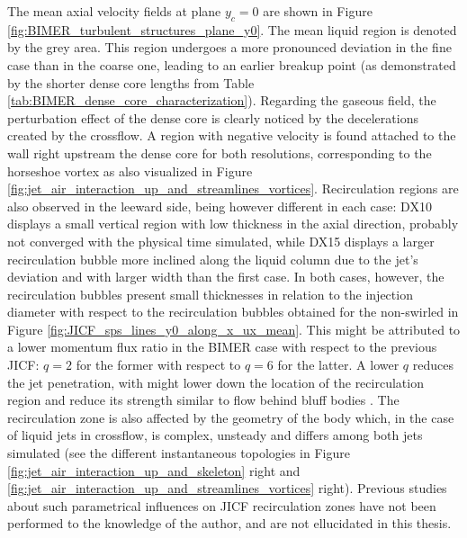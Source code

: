 The mean axial velocity fields at plane $y_c = 0$ are shown in Figure \ref{fig:BIMER_turbulent_structures_plane_y0}. The mean liquid region is denoted by the grey area. This region undergoes a more pronounced deviation in the fine case than in the coarse one, leading to an earlier breakup point (as demonstrated by the shorter dense core lengths from Table \ref{tab:BIMER_dense_core_characterization}). Regarding the gaseous field, the perturbation effect of the dense core is clearly noticed by the decelerations created by the crossflow. A region with negative velocity is found attached to the wall right upstream the dense core for both resolutions, corresponding to the horseshoe vortex as also visualized in Figure \ref{fig:jet_air_interaction_up_and_streamlines_vortices}. Recirculation regions are also observed in the leeward side, being however different in each case: DX10 displays a small vertical region with low thickness in the axial direction, probably not converged with the physical time simulated, while DX15 displays a larger recirculation bubble more inclined along the liquid column due to the jet's deviation  and with larger width than the first case. In both cases, however, the recirculation bubbles present small thicknesses in relation to the injection diameter with respect to the recirculation bubbles obtained  for the non-swirled in Figure \ref{fig:JICF_sps_lines_y0_along_x_ux_mean}. This might be attributed to a lower momentum flux ratio in the BIMER case with respect to the previous JICF: $q = 2$ for the former with respect to $q = 6$ for the latter. A lower $q$ reduces the jet penetration, with might lower down the location of the recirculation region and reduce its strength similar to flow behind bluff bodies . The recirculation zone is also affected by the geometry of the body which, in the case of liquid jets in crossflow, is complex, unsteady and differs among both jets simulated (see the different instantaneous topologies in Figure \ref{fig:jet_air_interaction_up_and_skeleton} right and \ref{fig:jet_air_interaction_up_and_streamlines_vortices} right). Previous studies about such parametrical influences on JICF recirculation zones have not been performed to the knowledge of the author, and are not ellucidated in this thesis. 


